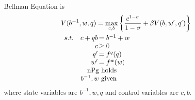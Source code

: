 \documentclass{article}
\begin{document}
\begin{enumerate}
        Bellman Equation is
        \begin{align*}
            &V(b^{-1},w,q)=\max_{c,b}\left\{\frac{c^{1-\sigma}}{1-\sigma}+\beta V(b,w',q')\right\}\\
            &\begin{array}{r@{\quad}r@{}l}
            s.t.&c+qb\,&=b^{-1}+w\\
            &c\,&\ge0\\
            &q'\,&=f^q(q)\\
            &w'\,&=f^w(w)\\
            &\text{nPg}&\text{ holds}\\
            &b^{-1},w &\text{ given}
            \end{array} 
        \end{align*}
        where state variables are $b^{-1},w,q$ and control variables are $c,b$.
    \end{enumerate}
\end{document}

